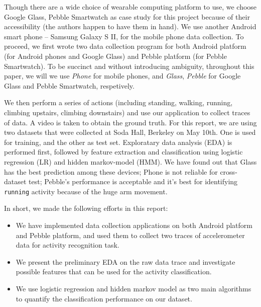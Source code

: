 Though there are a wide choice of wearable computing platform to use, we choose Google Glass, Pebble Smartwatch as case study for this project because of their accessibility (the authors happen to have them in hand). We use another Android smart phone -- Samsung Galaxy S II, for the mobile phone data collection. To proceed, we first wrote two data collection program for both Android platform (for Android phones and Google Glass) and Pebble platform (for Pebble Smartwatch). To be succinct and without introducing ambiguity, throughout this paper, we will we use {\em Phone} for mobile phones, and {\em Glass}, {\em Pebble} for Google Glass and Pebble Smartwatch, respetively. 

We then perform a series of actions (including standing, walking, running, climbing upstairs, climbing downstairs) and use our application to collect traces of data. A video is taken to obtain the ground truth. For this report, we are using two datasets that were collected at Soda Hall, Berkeley on May 10th. One is used for training, and the other as test set. Exploratary data analysis (EDA) is performed first, followed by feature extraction and classification using logistic regression (LR) and hidden markov-model (HMM). We have found out that Glass has the best prediction among these devices; Phone is not reliable for cross-dataset test; Pebble's performance is acceptable and it's best for identifying \texttt{running} activity because of the huge arm movement.

In short, we made the following efforts in this report:
\begin{itemize}
\item We have implemented data collection applications on both Android platform and Pebble platform, and used them to collect two traces of accelerometer data for activity recognition task.
\item We present the preliminary EDA on the raw data trace and investigate possible features that can be used for the activity classification.
\item We use logistic regression and hidden markov model as two main algorithms to quantify the classification performance on our dataset.
\end{itemize}


